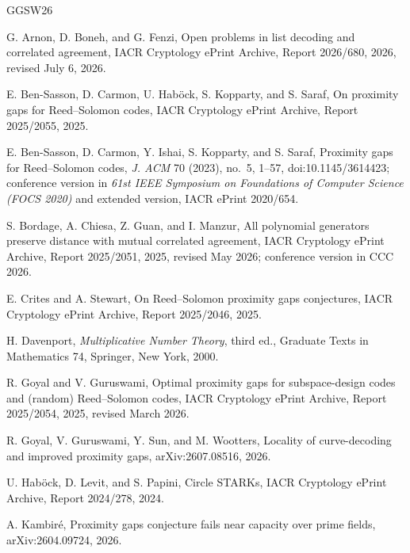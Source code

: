 \documentclass[11pt,a4paper]{amsart}
\numberwithin{equation}{section}
\theoremstyle{remark}
\begin{document}
\begin{thebibliography}{GGSW26}

G. Arnon, D. Boneh, and G. Fenzi,
\newblock Open problems in list decoding and correlated agreement,
\newblock IACR Cryptology ePrint Archive, Report 2026/680, 2026,
revised July 6, 2026.

E. Ben-Sasson, D. Carmon, U. Hab\"ock, S. Kopparty, and S. Saraf,
\newblock On proximity gaps for Reed--Solomon codes,
\newblock IACR Cryptology ePrint Archive, Report 2025/2055, 2025.

E. Ben-Sasson, D. Carmon, Y. Ishai, S. Kopparty, and S. Saraf,
\newblock Proximity gaps for Reed--Solomon codes,
\newblock \emph{J. ACM} 70 (2023), no.~5, 1--57,
\newblock doi:10.1145/3614423; conference version in
\emph{61st IEEE Symposium on Foundations of Computer Science
(FOCS 2020)} and extended version, IACR ePrint 2020/654.

S. Bordage, A. Chiesa, Z. Guan, and I. Manzur,
\newblock All polynomial generators preserve distance with mutual
correlated agreement,
\newblock IACR Cryptology ePrint Archive, Report 2025/2051, 2025,
 revised May 2026; conference version in CCC 2026.

E. Crites and A. Stewart,
\newblock On Reed--Solomon proximity gaps conjectures,
\newblock IACR Cryptology ePrint Archive, Report 2025/2046, 2025.

H. Davenport,
\newblock \emph{Multiplicative Number Theory}, third ed.,
\newblock Graduate Texts in Mathematics 74, Springer, New York, 2000.

R. Goyal and V. Guruswami,
\newblock Optimal proximity gaps for subspace-design codes and (random)
Reed--Solomon codes,
\newblock IACR Cryptology ePrint Archive, Report 2025/2054, 2025,
revised March 2026.

R. Goyal, V. Guruswami, Y. Sun, and M. Wootters,
\newblock Locality of curve-decoding and improved proximity gaps,
\newblock arXiv:2607.08516, 2026.

U. Hab\"ock, D. Levit, and S. Papini,
\newblock Circle STARKs,
\newblock IACR Cryptology ePrint Archive, Report 2024/278, 2024.

A. Kambir\'e,
\newblock Proximity gaps conjecture fails near capacity over prime fields,
\newblock arXiv:2604.09724, 2026.


\end{thebibliography}
\end{document}
